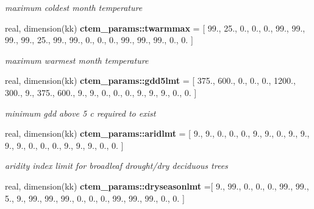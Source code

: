 \begin{DoxyCompactItemize}
\begin{DoxyCompactList}\small\item\em maximum coldest month temperature \end{DoxyCompactList}\item 
\hypertarget{namespacectem__params_a72a50f8b26e68efe36fe078e192726b7}{}real, dimension(kk) {\bfseries ctem\+\_\+params\+::twarmmax} = \mbox{[} 99., 25., 0., 0., 0., 99., 99., 99., 99., 25., 99., 99., 0., 0., 0., 99., 99., 99., 0., 0. \mbox{]}\label{namespacectem__params_a72a50f8b26e68efe36fe078e192726b7}

\begin{DoxyCompactList}\small\item\em maximum warmest month temperature \end{DoxyCompactList}\item 
\hypertarget{namespacectem__params_a6a7e5c14d01e4234fb7a0ee3fb795c34}{}real, dimension(kk) {\bfseries ctem\+\_\+params\+::gdd5lmt} = \mbox{[} 375., 600., 0., 0., 0., 1200., 300., 9., 375., 600., 9., 9., 0., 0., 0., 9., 9., 9., 0., 0. \mbox{]}\label{namespacectem__params_a6a7e5c14d01e4234fb7a0ee3fb795c34}

\begin{DoxyCompactList}\small\item\em minimum gdd above 5 c required to exist \end{DoxyCompactList}\item 
\hypertarget{namespacectem__params_a5fb0d8e073e3b32005845f96d7ee9eb5}{}real, dimension(kk) {\bfseries ctem\+\_\+params\+::aridlmt} = \mbox{[} 9., 9., 0., 0., 0., 9., 9., 0., 9., 9., 9., 9., 0., 0., 0., 9., 9., 9., 0., 0. \mbox{]}\label{namespacectem__params_a5fb0d8e073e3b32005845f96d7ee9eb5}

\begin{DoxyCompactList}\small\item\em aridity index limit for broadleaf drought/dry deciduous trees \end{DoxyCompactList}\item 
\hypertarget{namespacectem__params_af24fc4b3d8a43b3a8660e97fb81bce30}{}real, dimension(kk) {\bfseries ctem\+\_\+params\+::dryseasonlmt} =\mbox{[} 9., 99., 0., 0., 0., 99., 99., 5., 9., 99., 99., 99., 0., 0., 0., 99., 99., 99., 0., 0. \mbox{]}\label{namespacectem__params_af24fc4b3d8a43b3a8660e97fb81bce30}


\end{DoxyCompactItemize}
